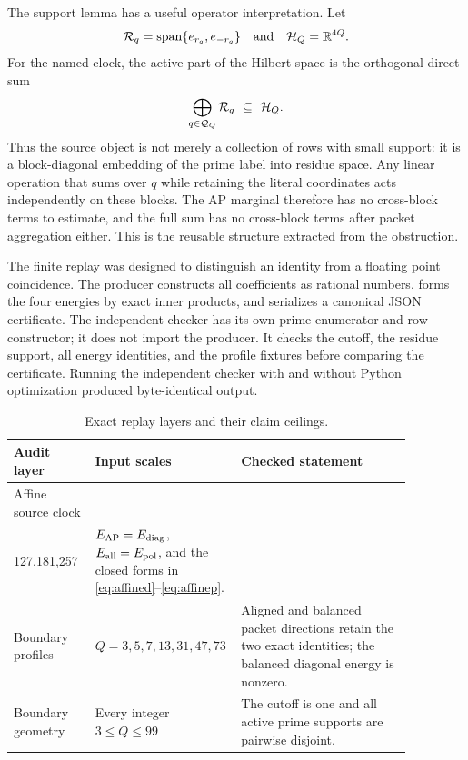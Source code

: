 \documentclass[11pt]{article}
\begin{document}
The support lemma has a useful operator interpretation.  Let
\[
 {\cal R}_q=\operatorname{span}\{e_{r_q},e_{-r_q}\}
 \quad\text{and}\quad
 {\cal H}_Q=\mathbb R^{4Q}.
\]
For the named clock, the active part of the Hilbert space is the orthogonal
direct sum
\begin{equation}
 \bigoplus_{q\in{\cal Q}_Q}{\cal R}_q\ \subseteq\ {\cal H}_Q .
\label{eq:block}
\end{equation}
Thus the source object is not merely a collection of rows with small
support: it is a block-diagonal embedding of the prime label into residue
space.  Any linear operation that sums over \(q\) while retaining the
literal coordinates acts independently on these blocks.  The AP marginal
therefore has no cross-block terms to estimate, and the full sum has no
cross-block terms after packet aggregation either.  This is the reusable
structure extracted from the obstruction.

The finite replay was designed to distinguish an identity from a floating
point coincidence.  The producer constructs all coefficients as rational
numbers, forms the four energies by exact inner products, and serializes a
canonical JSON certificate.  The independent checker has its own prime
enumerator and row constructor; it does not import the producer.  It checks
the cutoff, the residue support, all energy identities, and the profile
fixtures before comparing the certificate.  Running the independent checker
with and without Python optimization produced byte-identical output.

\begin{table}[t]
\centering
\caption{Exact replay layers and their claim ceilings.}
\label{tab:audits}
\begin{tabular}{p{0.20\linewidth}p{0.25\linewidth}p{0.42\linewidth}}
\toprule
Audit layer & Input scales & Checked statement\\
\midrule
Affine source clock &
\(\begin{gathered}11,17,29,43,61,89\\127,181,257\end{gathered}\) &
\(E_{\rm AP}=E_{\rm diag}\), \(E_{\rm all}=E_{\rm pol}\), and the
closed forms in \eqref{eq:affined}--\eqref{eq:affinep}.\\
Boundary profiles &
\(Q=3,5,7,13,31,47,73\) &
Aligned and balanced packet directions retain the two exact identities;
the balanced diagonal energy is nonzero.\\
Boundary geometry &
Every integer \(3\leq Q\leq99\) &
The cutoff is one and all active prime supports are pairwise disjoint.\\
\bottomrule
\end{tabular}
\end{table}
\end{document}
